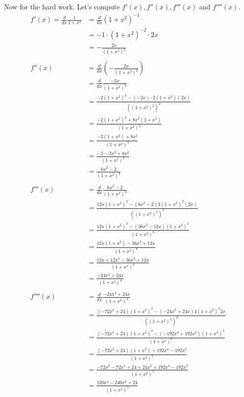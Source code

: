 \documentclass[9pt]{article}
\begin{document}
Now for the hard work. Let's compute $f'(x), f''(x), f'''(x)$ and $f''''(x)$.
\begin{align*}
  f'(x) = \frac{d}{dx} \frac{1}{1 + x^2} &= \frac{d}{dx}(1 + x^2)^{-1} \\
                                         &= -1 \cdot (1 + x^2)^{-2} \cdot 2x \\
                                         &= -\frac{2x}{(1 + x^2)^2} \\
\\
f''(x) &= \frac{d}{dx} (-\frac{2x}{(1 + x^2)^2}) \\
       &= \frac{d}{dx} \frac{-2x}{(1 + x^2)^2} \\
       &= \frac{-2(1 + x^2)^2 - (-2x)\cdot 2(1 + x^2)(2x)}{((1 + x^2)^2)^2} \\
       &= \frac{-2(1 + x^2)^2 + 8x^2 (1 + x^2)}{(1 + x^2)^4} \\
       &= \frac{-2(1 + x^2) + 8x^2}{(1 + x^2)^3} \\
       &= \frac{-2 - 2x^2 + 8x^2}{(1 + x^2)^3} \\
       &= \frac{6x^2 - 2}{(1 + x^2)^3} \\
\\
f'''(x) &= \frac{d}{dx} \frac{6x^2 - 2}{(1 + x^2)^3} \\
        &= \frac{12x (1 + x^2)^3 - (6x^2 - 2)3(1 + x^2)^2 (2x)}{((1 + x^2)^3)^2} \\
        &= \frac{12x (1 + x^2)^3 - (36x^3 - 12x)(1 + x^2)^2}{(1 + x^2)^6} \\
        &= \frac{12x (1 + x^2) - 36x^3 + 12x}{(1 + x^2)^4} \\
        &= \frac{12x + 12x^3 - 36x^3 + 12x}{(1 + x^2)^4} \\
        &= \frac{-24x^3 + 24x}{(1 + x^2)^4} \\
\\
f''''(x) &= \frac{d}{dx} \frac{-24x^3 + 24x}{(1 + x^2)^4} \\
         &= \frac{(-72x^2 + 24) (1 + x^2)^4 - (-24x^3 + 24x)4(1 + x^2)^3 2x}{((1 + x^2)^4)^2} \\
         &= \frac{(-72x^2 + 24) (1 + x^2)^4 - (-192x^4 + 192x^2)(1 + x^2)^3}{(1 + x^2)^8} \\
         &= \frac{(-72x^2 + 24) (1 + x^2) + 192x^4 - 192x^2}{(1 + x^2)^5} \\
         &= \frac{-72x^2 - 72x^4 + 24 + 24x^2 + 192x^4 - 192x^2}{(1 + x^2)^5} \\
         &= \frac{120x^4 - 240x^2 + 24}{(1 + x^2)^5}
\end{align*}
\end{document}
